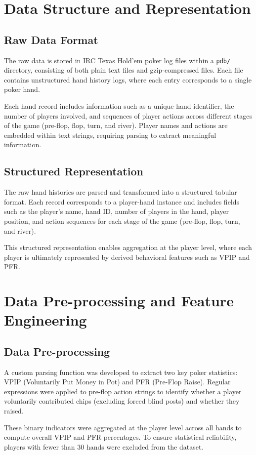 \documentclass[11pt]{extarticle}
\begin{document}
\section{Data Structure and Representation}
\subsection{Raw Data Format}
The raw data is stored in IRC Texas Hold'em poker log files within a \texttt{pdb/} directory, consisting of both plain text files and gzip-compressed files. Each file contains unstructured hand history logs, where each entry corresponds to a single poker hand.

Each hand record includes information such as a unique hand identifier, the number of players involved, and sequences of player actions across different stages of the game (pre-flop, flop, turn, and river). Player names and actions are embedded within text strings, requiring parsing to extract meaningful information.

\subsection{Structured Representation}
The raw hand histories are parsed and transformed into a structured tabular format. Each record corresponds to a player-hand instance and includes fields such as the player’s name, hand ID, number of players in the hand, player position, and action sequences for each stage of the game (pre-flop, flop, turn, and river).

This structured representation enables aggregation at the player level, where each player is ultimately represented by derived behavioral features such as VPIP and PFR.

\section{Data Pre-processing and Feature Engineering}
\subsection{Data Pre-processing}
A custom parsing function was developed to extract two key poker statistics: VPIP (Voluntarily Put Money in Pot) and PFR (Pre-Flop Raise). Regular expressions were applied to pre-flop action strings to identify whether a player voluntarily contributed chips (excluding forced blind posts) and whether they raised.

These binary indicators were aggregated at the player level across all hands to compute overall VPIP and PFR percentages. To ensure statistical reliability, players with fewer than 30 hands were excluded from the dataset.
\end{document}
